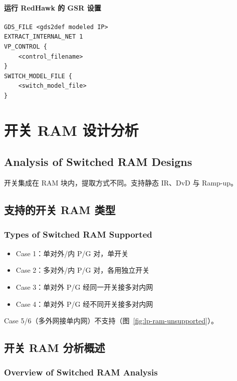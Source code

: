 \paragraph{运行 RedHawk 的 GSR 设置}
\begin{lstlisting}
GDS_FILE <gds2def modeled IP>
EXTRACT_INTERNAL_NET 1
VP_CONTROL {
    <control_filename>
}
SWITCH_MODEL_FILE {
    <switch_model_file>
}
\end{lstlisting}


\section{开关 RAM 设计分析}
\subsection*{Analysis of Switched RAM Designs}

开关集成在 RAM 块内，提取方式不同。支持静态 IR、DvD 与 Ramp-up。

\subsection{支持的开关 RAM 类型}
\subsubsection*{Types of Switched RAM Supported}

\begin{itemize}
  \item Case 1：单对外/内 P/G 对，单开关
  \item Case 2：多对外/内 P/G 对，各用独立开关
  \item Case 3：单对外 P/G 经同一开关接多对内网
  \item Case 4：单对外 P/G 经不同开关接多对内网
\end{itemize}


Case 5/6（多外网接单内网）不支持（图~\ref{fig:lp-ram-unsupported}）。


\subsection{开关 RAM 分析概述}
\subsubsection*{Overview of Switched RAM Analysis}

